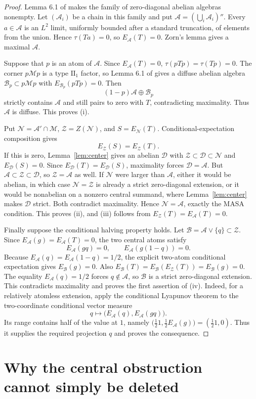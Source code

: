 \documentclass[11pt]{article}
\newcommand{\M}{\mathcal M}
\newcommand{\A}{\mathcal A}
\newcommand{\B}{\mathcal B}
\newcommand{\N}{\mathcal N}
\newcommand{\Z}{\mathcal Z}
\newcommand{\D}{\mathcal D}
\begin{document}
\begin{proof}
Lemma 6.1 of \cite{DS} makes the family of zero-diagonal abelian algebras
nonempty. Let $(\A_i)$ be a chain in this family and put
$\A=(\bigcup_i\A_i)''$. Every $a\in\A$ is an $L^2$ limit, uniformly bounded
after a standard truncation, of elements from the union. Hence
$\tau(Ta)=0$, so $E_{\A}(T)=0$. Zorn's lemma gives a maximal $\A$.

Suppose that $p$ is an atom of $\A$. Since $E_{\A}(T)=0$,
$\tau(pTp)=\tau(Tp)=0$. The corner $p\M p$ is a type $\mathrm{II}_1$ factor,
so Lemma 6.1 of \cite{DS} gives a diffuse abelian algebra
$\B_p\subset p\M p$ with $E_{\B_p}(pTp)=0$. Then
\[
   (1-p)\A\oplus\B_p
\]
strictly contains $\A$ and still pairs to zero with $T$, contradicting
maximality. Thus $\A$ is diffuse. This proves (i).

Put $\N=\A'\cap\M$, $\Z=Z(\N)$, and $S=E_{\N}(T)$. Conditional-expectation
composition gives
\[
 E_{\Z}(S)=E_{\Z}(T).
\]
If this is zero, Lemma~\ref{lem:center} gives an abelian
$\D$ with $\Z\subset\D\subset\N$ and $E_{\D}(S)=0$. Since
$E_{\D}(T)=E_{\D}(S)$, maximality forces $\D=\A$. But $\A\subset\Z\subset\D$,
so $\Z=\A$ as well. If $\N$ were larger than $\A$, either it would be
abelian, in which case $\N=\Z$ is already a strict zero-diagonal extension,
or it would be nonabelian on a nonzero central summand, where
Lemma~\ref{lem:center} makes $\D$ strict. Both contradict maximality. Hence
$\N=\A$, exactly the MASA condition. This proves (ii), and (iii) follows from
$E_{\Z}(T)=E_{\A}(T)=0$.

Finally suppose the conditional halving property holds. Let
$\B=\A\vee\{q\}\subset\Z$. Since $E_{\A}(g)=E_{\A}(T)=0$, the two central
atoms satisfy
\[
 E_{\A}(gq)=0,
 \qquad E_{\A}(g(1-q))=0.
\]
Because $E_{\A}(q)=E_{\A}(1-q)=1/2$, the explicit two-atom conditional
expectation gives $E_{\B}(g)=0$. Also
$E_{\B}(T)=E_{\B}(E_{\Z}(T))=E_{\B}(g)=0$. The equality
$E_{\A}(q)=1/2$ forces $q\notin\A$, so $\B$ is a strict zero-diagonal
extension. This contradicts maximality and proves the first assertion of
(iv). Indeed, for a relatively atomless extension, apply the conditional
Lyapunov theorem \cite{DE} to the two-coordinate conditional vector measure
\[
 q\longmapsto \bigl(E_{\A}(q),E_{\A}(gq)\bigr).
\]
Its range contains half of the value at $1$, namely
$\bigl(\tfrac12 1,\tfrac12 E_{\A}(g)\bigr)=(\tfrac12 1,0)$.
Thus it supplies the required projection $q$ and proves the consequence.
\end{proof}

\section{Why the central obstruction cannot simply be deleted}
\end{document}
